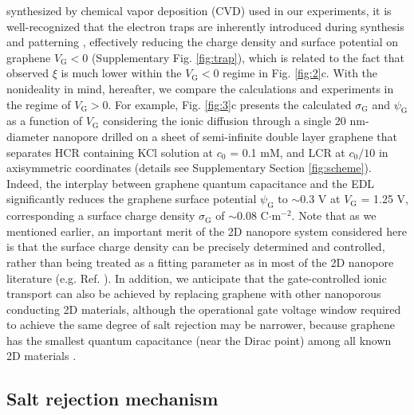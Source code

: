 \documentclass[journal=langd5,email=true, hyperref=true, keywords=false]{achemso}
\begin{document}
synthesized by chemical vapor deposition (CVD) used in our
experiments, it is well-recognized that the electron traps are
inherently introduced during synthesis and patterning
\cite{Dean_2010}, effectively reducing the charge density and surface
potential on graphene $V_{\mathrm{G}}<0$ (Supplementary Fig.
\ref{fig:trap}), which is related to the fact that observed $\xi$
is much lower within the $V_{\mathrm{G}}<0$ regime in Fig.
\ref{fig:2}c. With the nonideality in mind, hereafter, we compare the
calculations and experiments in the regime of $V_{\mathrm{G}}>0$. For
example, Fig. \ref{fig:3}c presents the calculated
$\sigma_{\mathrm{G}}$ and $\psi_{\mathrm{G}}$ as a function of
$V_{\mathrm{G}}$ considering the ionic diffusion through a single 20
nm-diameter nanopore drilled on a sheet of semi-infinite double layer
graphene that separates HCR containing KCl solution at $c_{0}$ = 0.1
mM, and LCR at $c_{0}/10$ in axisymmetric coordinates (details see
Supplementary Section \ref{fig:scheme}). Indeed, the interplay
between graphene quantum capacitance and the EDL significantly reduces
the graphene surface potential $\psi_{\mathrm{G}}$ to $\sim$0.3 V at
$V_{\mathrm{G}}$ = 1.25 V, corresponding a surface charge density
$\sigma_{\mathrm{G}}$ of $\sim$0.08 C$\cdot$m$^{-2}$. Note that as we
mentioned earlier, an important merit of the 2D nanopore system
considered here is that the surface charge density can be precisely
determined and controlled, rather than being treated as a fitting
parameter as in most of the 2D nanopore literature
(e.g. Ref. ). In addition, we anticipate that
the gate-controlled ionic transport can also be achieved by replacing
graphene with other nanoporous conducting 2D materials, although the
operational gate voltage window required to achieve the same degree of
salt rejection may be narrower, because graphene has the smallest
quantum capacitance (near the Dirac point) among all known 2D
materials \cite{Tian_2016}.

\subsection*{Salt rejection mechanism}
\label{sec:mechanism}
\end{document}
